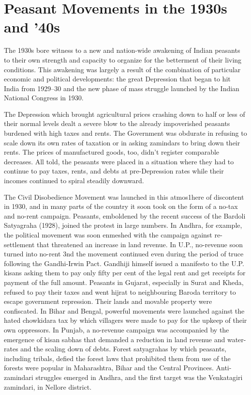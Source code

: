 
\chapter{Peasant Movements in the 1930s and '40s}

The 1930s bore witness to a new and nation-wide awakening of Indian peasants to their own strength and capacity to organize for the betterment of their living conditions. This awakening was largely a result of the combination of particular economic and political developments: the great Depression that began to hit India from 1929--30 and the new phase of mass struggle launched by the Indian National Congress in 1930.

The Depression which brought agricultural prices crashing down to half or less of their normal levels dealt a severe blow to the already impoverished peasants burdened with high taxes and rents. The Government was obdurate in refusing to scale down its own rates of taxation or in asking zamindars to bring down their rents. The prices of manufactured goods, too, didn't register comparable decreases. All told, the peasants were placed in a situation where they had to continue to pay taxes, rents, and debts at pre-Depression rates while their incomes continued to spiral steadily downward.

The Civil Disobedience Movement was launched in this atmos1here of discontent in 1930, and in many parts of the country it soon took on the form of a no-tax and no-rent campaign. Peasants, emboldened by the recent success of the Bardoli Satyagraha (1928), joined the protest in large numbers. In Andhra, for example, the political movement was soon enmeshed with the campaign against re-settlement that threatened an increase in land revenue. In U.P., no-revenue soon turned into no-rent 3nd the movement continued even during the period of truce following the Gandhi-Irwin Pact. Gandhiji himself issued a manifesto to the U.P. kisans asking them to pay only fifty per cent of the legal rent and get receipts for payment of the full amount. Peasants in Gujarat, especially in Surat and Kheda, refused to pay their taxes and went hijrat to neighbouring Baroda territory to escape government repression. Their lands and movable property were confiscated. In Bihar and Bengal, powerful movements were launched against the hated chowkidara tax by which villagers were made to pay for the upkeep of their own oppressors. In Punjab, a no-revenue campaign was accompanied by the emergence of kisan sabhas that demanded a reduction in land revenue and water-rates and the scaling down of debts. Forest satyagrahas by which peasants, including tribals, defied the forest laws that prohibited them from use of the forests were popular in Maharashtra, Bihar and the Central Provinces. Anti-zamindari struggles emerged in Andhra, and the first target was the Venkatagiri zamindari, in Nellore district.

